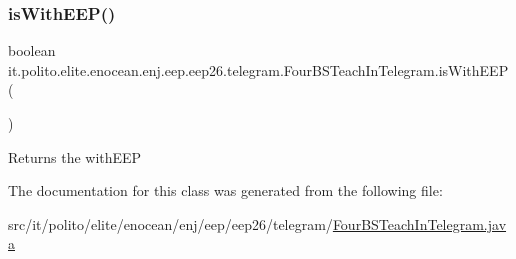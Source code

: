 \subsubsection{\texorpdfstring{is\+With\+E\+E\+P()}{isWithEEP()}}
{\footnotesize\ttfamily boolean it.\+polito.\+elite.\+enocean.\+enj.\+eep.\+eep26.\+telegram.\+Four\+B\+S\+Teach\+In\+Telegram.\+is\+With\+E\+EP (\begin{DoxyParamCaption}{ }\end{DoxyParamCaption})}

\begin{DoxyReturn}{Returns}
the with\+E\+EP 
\end{DoxyReturn}


The documentation for this class was generated from the following file\+:\begin{DoxyCompactItemize}
\item 
src/it/polito/elite/enocean/enj/eep/eep26/telegram/\hyperlink{_four_b_s_teach_in_telegram_8java}{Four\+B\+S\+Teach\+In\+Telegram.\+java}\end{DoxyCompactItemize}
